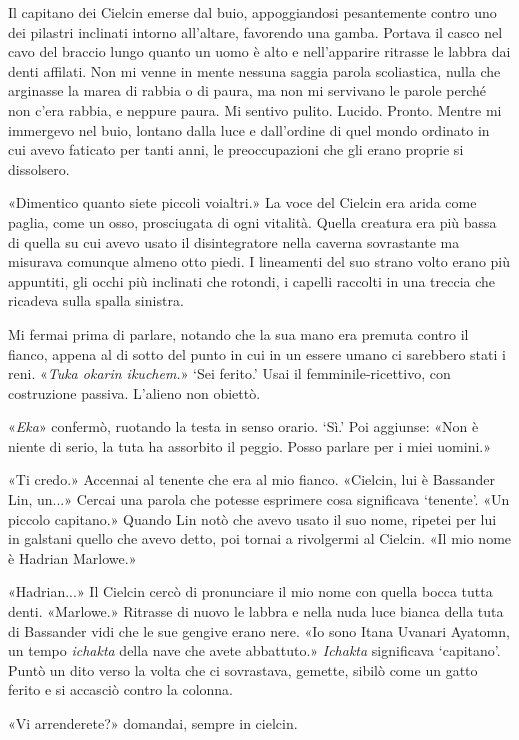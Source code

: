 Il capitano dei Cielcin emerse dal buio, appoggiandosi pesantemente
contro uno dei pilastri inclinati intorno all'altare, favorendo una
gamba. Portava il casco nel cavo del braccio lungo quanto un uomo è alto
e nell'apparire ritrasse le labbra dai denti affilati. Non mi venne in
mente nessuna saggia parola scoliastica, nulla che arginasse la marea di
rabbia o di paura, ma non mi servivano le parole perché non c'era
rabbia, e neppure paura. Mi sentivo pulito. Lucido. Pronto. Mentre mi
immergevo nel buio, lontano dalla luce e dall'ordine di quel mondo
ordinato in cui avevo faticato per tanti anni, le preoccupazioni che gli
erano proprie si dissolsero.

«Dimentico quanto siete piccoli voialtri.» La voce del Cielcin era arida
come paglia, come un osso, prosciugata di ogni vitalità. Quella creatura
era più bassa di quella su cui avevo usato il disintegratore nella
caverna sovrastante ma misurava comunque almeno otto piedi. I lineamenti
del suo strano volto erano più appuntiti, gli occhi più inclinati che
rotondi, i capelli raccolti in una treccia che ricadeva sulla spalla
sinistra.

Mi fermai prima di parlare, notando che la sua mano era premuta contro
il fianco, appena al di sotto del punto in cui in un essere umano ci
sarebbero stati i reni. «\emph{Tuka okarin ikuchem.}» `Sei ferito.' Usai
il femminile-ricettivo, con costruzione passiva. L'alieno non obiettò.

«\emph{Eka}» confermò, ruotando la testa in senso orario. `Sì.' Poi
aggiunse: «Non è niente di serio, la tuta ha assorbito il peggio. Posso
parlare per i miei uomini.»

«Ti credo.» Accennai al tenente che era al mio fianco. «Cielcin, lui è
Bassander Lin, un...» Cercai una parola che potesse esprimere cosa
significava `tenente'. «Un piccolo capitano.» Quando Lin notò che avevo
usato il suo nome, ripetei per lui in galstani quello che avevo detto,
poi tornai a rivolgermi al Cielcin. «Il mio nome è Hadrian Marlowe.»

«Hadrian...» Il Cielcin cercò di pronunciare il mio nome con quella
bocca tutta denti. «Marlowe.» Ritrasse di nuovo le labbra e nella nuda
luce bianca della tuta di Bassander vidi che le sue gengive erano nere.
«Io sono Itana Uvanari Ayatomn, un tempo \emph{ichakta} della nave che
avete abbattuto.» \emph{Ichakta} significava `capitano'. Puntò un dito
verso la volta che ci sovrastava, gemette, sibilò come un gatto ferito e
si accasciò contro la colonna.

«Vi arrenderete?» domandai, sempre in cielcin.

